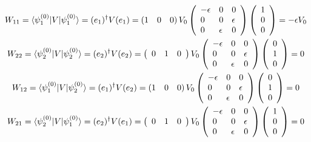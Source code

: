 \documentclass{tstextbook}
\begin{document}
\begin{example}
\begin{gather*}W_{11}=\langle \psi_{1}^{(0)}|V|\psi_{1}^{(0)} \rangle=(e_{1})^{\dagger}V(e_{1})=\left(1\quad0\quad0\right)V_{0}\left(\begin{array}{l l l}{{-\epsilon}}&{{0}}&{{0}}\\ {{0}}&{{0}}&{{\epsilon}}\\ {{0}}&{{\epsilon}}&{{0}}\end{array}\right)\left(\begin{array}{l}{{1}}\\ {{0}}\\ {{0}}\end{array}\right)=-\epsilon V_{0}\\ W_{22}=\langle \psi_{2}^{(0)}|V|\psi_{2}^{(0)} \rangle=(e_{2})^{\dagger}V(e_{2})=\left(\begin{array}{l l l}{{0}}&{{1}}&{{0}}\end{array}\right)V_{0}\left(\begin{array}{l l l}{{-\epsilon}}&{{0}}&{{0}}\\ {{0}}&{{0}}&{{\epsilon}}\\ {{0}}&{{\epsilon}}&{{0}}\end{array}\right)\left(\begin{array}{l}{{0}}\\ {{1}}\\ {{0}}\end{array}\right)=0\\ W_{12}=\langle \psi_{1}^{(0)}|V|\psi_{2}^{(0)} \rangle=(e_{1})^{\dagger}V(e_{2})=\left(1\quad0\quad0\right)V_{0}\left(\begin{array}{l l l}{{-\epsilon}}&{{0}}&{{0}}\\ {{0}}&{{0}}&{{\epsilon}}\\ {{0}}&{{\epsilon}}&{{0}}\end{array}\right)\left(\begin{array}{l}{{0}}\\ {{1}}\\ {{0}}\end{array}\right)=0\\ W_{21}=\langle \psi_{2}^{(0)}|V|\psi_{1}^{(0)} \rangle=(e_{2})^{\dagger}V(e_{1})=\left(\begin{array}{l l l}{{0}}&{{1}}&{{0}}\end{array}\right)V_{0}\left(\begin{array}{l l l}{{-\epsilon}}&{{0}}&{{0}}\\ {{0}}&{{0}}&{{\epsilon}}\\ {{0}}&{{\epsilon}}&{{0}}\end{array}\right)\left(\begin{array}{l}{{1}}\\ {{0}}\\ {{0}}\end{array}\right)=0

\end{gather*}
\end{example}
\end{document}
